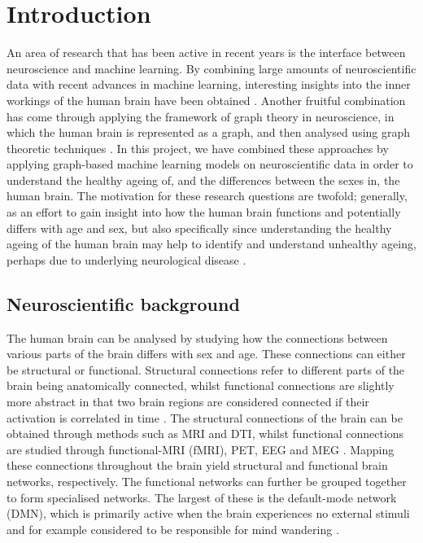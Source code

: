 \chapter{Introduction}



An area of research that has been active in recent years is the interface between neuroscience and machine learning. By combining large amounts of neuroscientific data with recent advances in machine learning, interesting insights into the inner workings of the human brain have been obtained \cite{neuro_ml, amoroso_multiplex_age, amoroso_multiplex_ad}. Another fruitful combination has come through applying the framework of graph theory in neuroscience, in which the human brain is represented as a graph, and then analysed using graph theoretic techniques \cite{chan, braph}. In this project, we have combined these approaches by applying graph-based machine learning models on neuroscientific data in order to understand the healthy ageing of, and the differences between the sexes in, the human brain. The motivation for these research questions are twofold; generally, as an effort to gain insight into how the human brain functions and potentially differs with age and sex, but also specifically since understanding the healthy ageing of the human brain may help to identify and understand unhealthy ageing, perhaps due to underlying neurological disease \cite{kaufmann}. 


\section{Neuroscientific background}

The human brain can be analysed by studying how the connections between various parts of the brain differs with sex and age. These connections can either be structural or functional. Structural connections refer to different parts of the brain being anatomically connected, whilst functional connections are slightly more abstract in that two brain regions are considered connected if their activation is correlated in time \cite{sporns}. The structural connections of the brain can be obtained through methods such as MRI and DTI, whilst functional connections are studied through functional-MRI (fMRI), PET, EEG and MEG \cite{hirsch}. Mapping these connections throughout the brain yield structural and functional brain networks, respectively. The functional networks can further be grouped together to form specialised networks. The largest of these is the default-mode network (DMN), which is primarily active when the brain experiences no external stimuli and for example considered to be responsible for mind wandering \cite{alves_dmn}.

